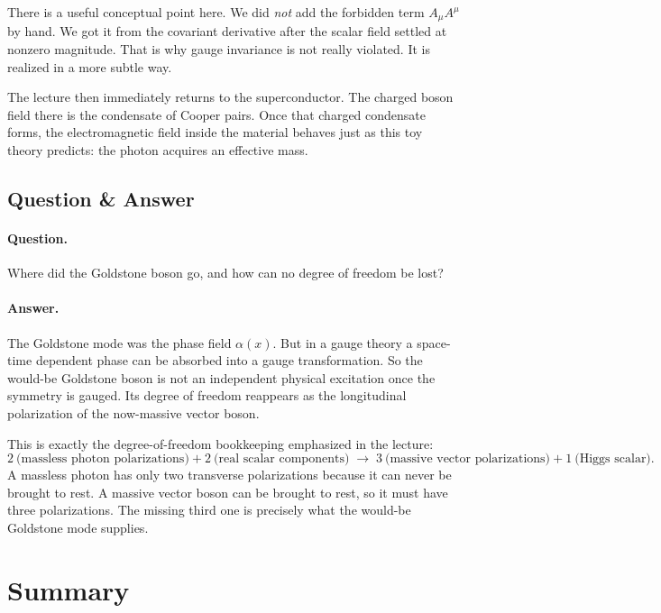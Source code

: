 There is a useful conceptual point here. We did \emph{not} add the forbidden term \(A_\mu A^\mu\) by hand. We got it from the covariant derivative after the scalar field settled at nonzero magnitude. That is why gauge invariance is not really violated. It is realized in a more subtle way.

The lecture then immediately returns to the superconductor. The charged boson field there is the condensate of Cooper pairs. Once that charged condensate forms, the electromagnetic field inside the material behaves just as this toy theory predicts: the photon acquires an effective mass.

\subsection{Question \& Answer}

\paragraph{Question.} Where did the Goldstone boson go, and how can no degree of freedom be lost?

\paragraph{Answer.} The Goldstone mode was the phase field \(\alpha(x)\). But in a gauge theory a space-time dependent phase can be absorbed into a gauge transformation. So the would-be Goldstone boson is not an independent physical excitation once the symmetry is gauged. Its degree of freedom reappears as the longitudinal polarization of the now-massive vector boson.

This is exactly the degree-of-freedom bookkeeping emphasized in the lecture:
\begin{equation}
2\ \text{(massless photon polarizations)}
+
2\ \text{(real scalar components)}
\;\longrightarrow\;
3\ \text{(massive vector polarizations)}
+
1\ \text{(Higgs scalar)}.
\end{equation}
A massless photon has only two transverse polarizations because it can never be brought to rest. A massive vector boson can be brought to rest, so it must have three polarizations. The missing third one is precisely what the would-be Goldstone mode supplies.

\section{Summary}


